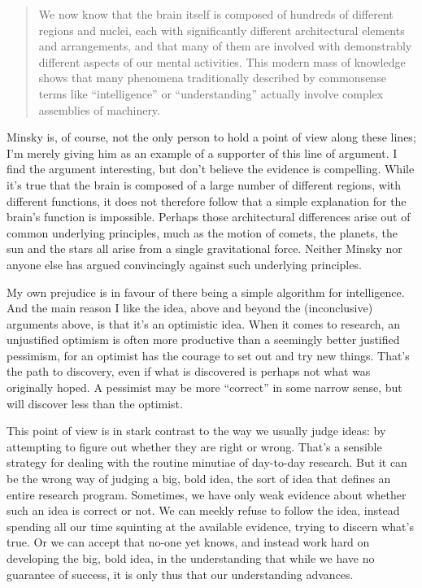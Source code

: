 \begin{quote}
We now know that the brain itself is composed of hundreds of different regions and nuclei, each with significantly different architectural elements and arrangements, and that many of them are involved with demonstrably different aspects of our mental activities. This modern mass of knowledge shows that many phenomena traditionally described by commonsense terms like ``intelligence'' or ``understanding'' actually involve complex assemblies of machinery. 
\end{quote}
Minsky is, of course, not the only person to hold a point of view along these lines; I'm merely giving him as an example of a supporter of this line of argument. I find the argument interesting, but don't believe the evidence is compelling. While it's true that the brain is composed of a large number of different regions, with different functions, it does not therefore follow that a simple explanation for the brain's function is impossible. Perhaps those architectural differences arise out of common underlying principles, much as the motion of comets, the planets, the sun and the stars all arise from a single gravitational force. Neither Minsky nor anyone else has argued convincingly against such underlying principles.

My own prejudice is in favour of there being a simple algorithm for intelligence. And the main reason I like the idea, above and beyond the (inconclusive) arguments above, is that it's an optimistic idea. When it comes to research, an unjustified optimism is often more productive than a seemingly better justified pessimism, for an optimist has the courage to set out and try new things. That's the path to discovery, even if what is discovered is perhaps not what was originally hoped. A pessimist may be more ``correct'' in some narrow sense, but will discover less than the optimist.

This point of view is in stark contrast to the way we usually judge ideas: by attempting to figure out whether they are right or wrong. That's a sensible strategy for dealing with the routine minutiae of day-to-day research. But it can be the wrong way of judging a big, bold idea, the sort of idea that defines an entire research program. Sometimes, we have only weak evidence about whether such an idea is correct or not. We can meekly refuse to follow the idea, instead spending all our time squinting at the available evidence, trying to discern what's true. Or we can accept that no-one yet knows, and instead work hard on developing the big, bold idea, in the understanding that while we have no guarantee of success, it is only thus that our understanding advances.

